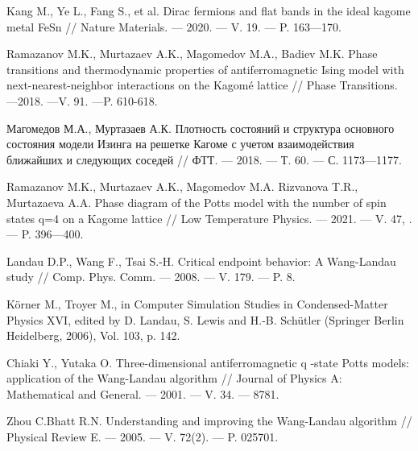 \begin{thebibliography}{111}
  Kang M., Ye L., Fang S., et al.
  Dirac fermions and flat bands in the ideal kagome metal FeSn
  //
  Nature Materials.
  --- 2020.
  --- V. 19.
  --- P. 163---170.
  
  Ramazanov M.K., Murtazaev A.K., Magomedov M.A., Badiev M.K.
  Phase transitions and thermodynamic properties of antiferromagnetic Ising model with next-nearest-neighbor interactions on the Kagomé lattice
  //
  Phase Transitions. ---2018. ---V. 91. ---P. 610-618.
  
  Магомедов М.А., Муртазаев А.К.
  Плотность состояний и структура основного состояния модели Изинга на решетке Кагоме с учетом взаимодействия ближайших и следующих соседей
  //
  ФТТ.
  --- 2018.
  --- Т. 60.
  --- С. 1173---1177.
  
  Ramazanov M.K., Murtazaev A.K., Magomedov M.A. Rizvanova T.R., Murtazaeva A.A.
  Phase diagram of the Potts model with the number of spin states q=4 on a Kagome lattice
  //
  Low Temperature Physics.
  --- 2021.
  --- V. 47, .
  --- P. 396---400.
  
  Landau D.P., Wang F., Tsai S.-H.
  Critical endpoint behavior: A Wang-Landau study
  //
  Comp. Phys. Comm.
  --- 2008.
  --- V. 179.
  --- P. 8.
  
  Körner M., Troyer M., in Computer Simulation Studies in Condensed-Matter Physics XVI, edited by D. Landau, S. Lewis and H.-B. Schütler (Springer Berlin Heidelberg, 2006), Vol. 103, p. 142.
  
  Chiaki Y., Yutaka O.
  Three-dimensional antiferromagnetic q -state Potts models: application of the Wang-Landau algorithm
  //
  Journal of Physics A: Mathematical and General.
  --- 2001.
  --- V. 34.
  --- 8781.
  
  Zhou C.Bhatt R.N.
  Understanding and improving the Wang-Landau algorithm
  //
  Physical Review E.
  --- 2005.
  --- V. 72(2).
  --- P. 025701.

\end{thebibliography} 